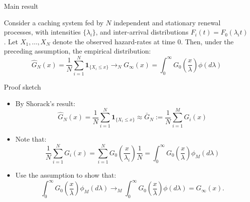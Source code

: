 \documentclass[aspectratio=169]{beamer}
\newcommand{\ind}[1]{\mathbf{1}_{#1}}
\newenvironment*{myitem}[1][1.5em]{\begin{itemize}\setlength{\itemsep}{#1}}{\end{itemize}}
\begin{document}
\begin{frame}{Main result}

	\begin{theorem}
		Consider a caching system fed by $N$ independent and stationary renewal processes, with intensities $\{\lambda_i\}$, and inter-arrival distributions $F_i(t)=F_0(\lambda_i t)$. Let $X_1,\ldots,X_N$ denote the observed hazard-rates at time $0$. Then, under the preceding assumption, the empirical distribution:
		\begin{equation*}
			\hat{G}_N(x) = \frac{1}{N}\sum_{i=1}^N \ind{\{X_i\leqslant x\}} \to_N G_\infty(x) = \int_0^\infty G_0\left(\frac{x}{\lambda}\right) \phi(d\lambda)
		\end{equation*}
	\end{theorem}

\end{frame}

\begin{frame}{Proof sketch}
	
	\begin{myitem}[2em]

		\item By Shorack's result:
		 \begin{equation*}
			\hat{G}_N(x) = \frac{1}{N}\sum_{i=1}^N \ind{\{X_i\leqslant x\}} \approx \bar{G}_N := \frac{1}{N} \sum_{i=1}^M G_i(x)
		 \end{equation*}

		 \item Note that:
		 \begin{equation*}
			\frac{1}{N} \sum_{i=1}^N G_i(x) = \sum_{i=1}^N G_0\left(\frac{x}{\lambda_i}\right) \frac{1}{N} = \int_0^\infty G_0\left(\frac{x}{\lambda}\right) \phi_M(d\lambda)
		 \end{equation*}

		 \item Use the assumption to show that:
		 \begin{equation*}
			\int_0^\infty G_0\left(\frac{x}{\lambda}\right) \phi_M(d\lambda) \to_M \int_0^\infty G_0\left(\frac{x}{\lambda}\right) \phi(d\lambda) = G_\infty(x).
		 \end{equation*}

	\end{myitem}
\end{frame}
\end{document}
